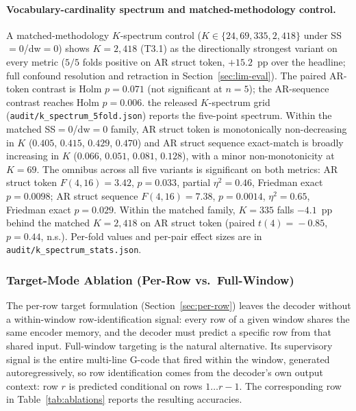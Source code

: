 \documentclass[sensors,article,submit,moreauthors,pdftex]{Definitions/mdpi}
\begin{document}


\paragraph{Vocabulary-cardinality spectrum and matched-methodology control.}
A matched-methodology $K$-spectrum control ($K\!\in\!\{24, 69, 335, 2{,}418\}$ under SS$=$0/dw$=$0) shows $K\!=\!2{,}418$ (T3.1) as the directionally strongest variant on every metric ($5/5$ folds positive on AR struct token, $+15.2$~pp over the headline; full confound resolution and retraction in Section~\ref{sec:lim-eval}). The paired AR-token contrast is Holm $p\!=\!0.071$ (not significant at $n\!=\!5$); the AR-sequence contrast reaches Holm $p\!=\!0.006$. the released $K$-spectrum grid (\texttt{audit/k\_spectrum\_5fold.json}) reports the five-point spectrum. Within the matched SS$=$0/dw$=$0 family, AR struct token is monotonically non-decreasing in $K$ ($0.405$, $0.415$, $0.429$, $0.470$) and AR struct sequence exact-match is broadly increasing in $K$ ($0.066$, $0.051$, $0.081$, $0.128$), with a minor non-monotonicity at $K\!=\!69$. The omnibus across all five variants is significant on both metrics: AR struct token $F(4,16)\!=\!3.42$, $p\!=\!0.033$, partial $\eta^{2}\!=\!0.46$, Friedman exact $p\!=\!0.0098$; AR struct sequence $F(4,16)\!=\!7.38$, $p\!=\!0.0014$, $\eta^{2}\!=\!0.65$, Friedman exact $p\!=\!0.029$. Within the matched family, $K\!=\!335$ falls $-4.1$~pp behind the matched $K\!=\!2{,}418$ on AR struct token (paired $t(4)\!=\!-0.85$, $p\!=\!0.44$, n.s.). Per-fold values and per-pair effect sizes are in \texttt{audit/k\_spectrum\_stats.json}.


\subsubsection{Target-Mode Ablation (Per-Row vs.\ Full-Window)}
\label{sec:abl-target-mode}

The per-row target formulation (Section~\ref{sec:per-row}) leaves the decoder without a within-window row-identification signal: every row of a given window shares the same encoder memory, and the decoder must predict a specific row from that shared input. Full-window targeting is the natural alternative. Its supervisory signal is the entire multi-line G-code that fired within the window, generated autoregressively, so row identification comes from the decoder's own output context: row $r$ is predicted conditional on rows $1\!\dots\!r-1$. The corresponding row in Table~\ref{tab:ablations} reports the resulting accuracies.
\end{document}
